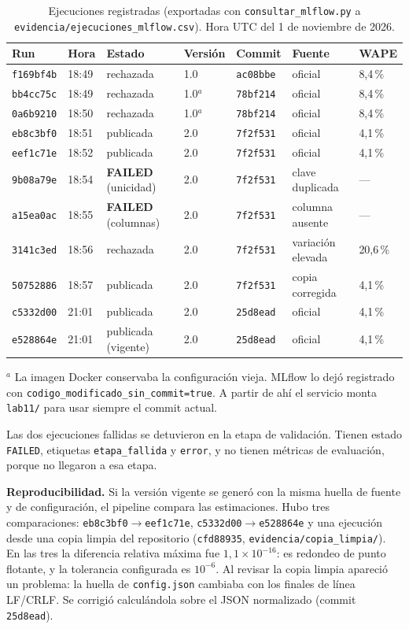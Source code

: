 \documentclass[11pt,letterpaper]{article}
\newcommand{\run}[1]{\texttt{#1}}
\begin{document}
\begin{table}[H]
\centering\footnotesize
\caption{Ejecuciones registradas (exportadas con \texttt{consultar\_mlflow.py} a \texttt{evidencia/ejecuciones\_mlflow.csv}). Hora UTC del 1 de noviembre de 2026.}
\begin{tabular}{@{}lllllll@{}}
\toprule
Run & Hora & Estado & Versión & Commit & Fuente & WAPE \\
\midrule
\run{f169bf4b} & 18:49 & rechazada & 1.0 & \run{ac08bbe} & oficial & 8,4\,\% \\
\run{bb4cc75c} & 18:49 & rechazada & 1.0$^{a}$ & \run{78bf214} & oficial & 8,4\,\% \\
\run{0a6b9210} & 18:50 & rechazada & 1.0$^{a}$ & \run{78bf214} & oficial & 8,4\,\% \\
\run{eb8c3bf0} & 18:51 & publicada & 2.0 & \run{7f2f531} & oficial & 4,1\,\% \\
\run{eef1c71e} & 18:52 & publicada & 2.0 & \run{7f2f531} & oficial & 4,1\,\% \\
\run{9b08a79e} & 18:54 & \textbf{FAILED} (unicidad) & 2.0 & \run{7f2f531} & clave duplicada & --- \\
\run{a15ea0ac} & 18:55 & \textbf{FAILED} (columnas) & 2.0 & \run{7f2f531} & columna ausente & --- \\
\run{3141c3ed} & 18:56 & rechazada & 2.0 & \run{7f2f531} & variación elevada & 20,6\,\% \\
\run{50752886} & 18:57 & publicada & 2.0 & \run{7f2f531} & copia corregida & 4,1\,\% \\
\run{c5332d00} & 21:01 & publicada & 2.0 & \run{25d8ead} & oficial & 4,1\,\% \\
\run{e528864e} & 21:01 & publicada (vigente) & 2.0 & \run{25d8ead} & oficial & 4,1\,\% \\
\bottomrule
\end{tabular}

\raggedright\footnotesize $^{a}$ La imagen Docker conservaba la configuración vieja. MLflow lo dejó registrado con \texttt{codigo\_modificado\_sin\_commit=true}. A partir de ahí el servicio monta \texttt{lab11/} para usar siempre el commit actual.
\end{table}

Las dos ejecuciones fallidas se detuvieron en la etapa de validación. Tienen estado \texttt{FAILED}, etiquetas \texttt{etapa\_fallida} y \texttt{error}, y no tienen métricas de evaluación, porque no llegaron a esa etapa.

\textbf{Reproducibilidad.} Si la versión vigente se generó con la misma huella de fuente y de configuración, el pipeline compara las estimaciones. Hubo tres comparaciones: \run{eb8c3bf0}$\rightarrow$\run{eef1c71e}, \run{c5332d00}$\rightarrow$\run{e528864e} y una ejecución desde una copia limpia del repositorio (\run{cfd88935}, \texttt{evidencia/copia\_limpia/}). En las tres la diferencia relativa máxima fue $1{,}1\times10^{-16}$: es redondeo de punto flotante, y la tolerancia configurada es $10^{-6}$. Al revisar la copia limpia apareció un problema: la huella de \texttt{config.json} cambiaba con los finales de línea LF/CRLF. Se corrigió calculándola sobre el JSON normalizado (commit \run{25d8ead}).
\end{document}
